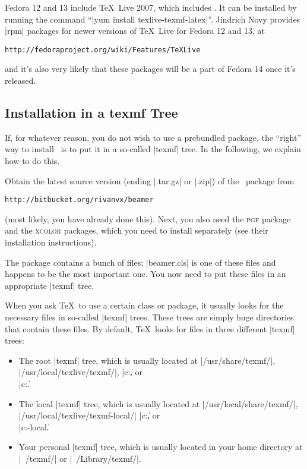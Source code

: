 Fedora 12 and 13 include \TeX\ Live 2007, which includes \beamer. It can be installed by running the command ``|yum install texlive-texmf-latex|''. Jindrich Novy provides |rpm| packages for newer versions of \TeX\ Live for Fedora 12 and 13, at
\begin{verbatim}
http://fedoraproject.org/wiki/Features/TeXLive
\end{verbatim}
and it's also very likely that these packages will be a part of Fedora 14 once it's released.


\subsection{Installation in a texmf Tree}

If, for whatever reason, you do not wish to use a prebundled package, the ``right'' way to install \beamer\ is to put it in a so-called |texmf| tree. In the following, we explain how to do this.

Obtain the latest source version (ending |.tar.gz| or |.zip|) of the \beamer\ package from
\begin{verbatim}
http://bitbucket.org/rivanvx/beamer
\end{verbatim}
(most likely, you have already done this). Next, you also need the \textsc{pgf} package and the \textsc{xcolor} packages, which you need to install separately (see their installation instructions).

The package contains a bunch of files; |beamer.cls| is one of these files and happens to be the most important one. You now need to put these files in an appropriate |texmf| tree.

When you ask \TeX\ to use a certain class or package, it usually looks for the necessary files in so-called |texmf| trees. These trees are simply huge directories that contain these files. By default, \TeX\ looks for files in three different |texmf| trees:
\begin{itemize}
\item
  The root |texmf| tree, which is usually located at |/usr/share/texmf/|, |/usr/local/texlive/texmf/|, |c:\texmf\|, or\\ |c:\texlive\texmf\|.
\item
  The local  |texmf| tree, which is usually located at |/usr/local/share/texmf/|, |/usr/local/texlive/texmf-local/| |c:\localtexmf\|, or\\ |c:\texlive\texmf-local\|.
\item
  Your personal |texmf| tree, which is usually located in your home directory at |~/texmf/| or |~/Library/texmf/|.
\end{itemize}

